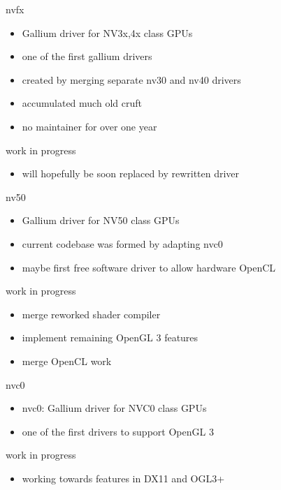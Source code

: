 \documentclass[11pt,english,compress]{beamer}
\begin{document}
		\begin{frame}
			\begin{block}{nvfx}
				\begin{itemize}
					\item Gallium driver for NV3x,4x class GPUs
					\item one of the first gallium drivers
					\item created by merging separate nv30 and nv40 drivers
					\item accumulated much old cruft
					\item no maintainer for over one year
				\end{itemize}
			\end{block}
			\begin{block}{work in progress}
				\begin{itemize}
					\item will hopefully be soon replaced by rewritten driver
				\end{itemize}
			\end{block}
		\end{frame}
		\begin{frame}
			\begin{block}{nv50}
				\begin{itemize}
					\item Gallium driver for NV50 class GPUs
					\item current codebase was formed by adapting nvc0
					\item maybe first free software driver to allow hardware OpenCL
				\end{itemize}
			\end{block}
			\begin{block}{work in progress}
				\begin{itemize}
					\item merge reworked shader compiler
					\item implement remaining OpenGL 3 features
					\item merge OpenCL work
				\end{itemize}
			\end{block}
		\end{frame}
		\begin{frame}
			\begin{block}{nvc0}
				\begin{itemize}
					\item nvc0: Gallium driver for NVC0 class GPUs
					\item one of the first drivers to support OpenGL 3
				\end{itemize}
			\end{block}
			\begin{block}{work in progress}
				\begin{itemize}
					\item working towards features in DX11 and OGL3+
				\end{itemize}
			\end{block}
		\end{frame}
\end{document}

